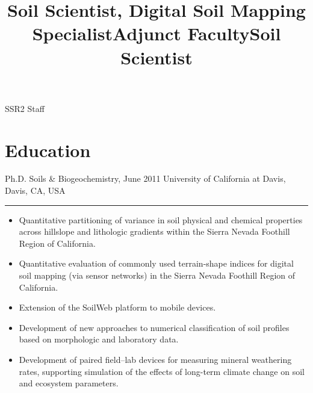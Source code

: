 \documentclass[overlapped,line,10pt,letterpaper]{res}
\begin{document}
\begin{resume}
\title{Soil Scientist, Digital Soil Mapping Specialist}
\begin{position}
\begin{minipage}{0.95\textwidth}
SSR2 Staff
\end{minipage}
\end{position}

\title{Adjunct Faculty}
\begin{position}
\end{position}

\title{Soil Scientist}
\begin{position}
\end{position}

\section{\bf Education}
Ph.D. Soils \& Biogeochemistry, June 2011 \newline
University of California at Davis, Davis, CA, USA
\\
\begin{minipage}{0.95\textwidth}
\hrule
\begin{itemize}[itemsep=0.05cm,leftmargin=*]
\small
\vspace{0.125cm}

	\item Quantitative partitioning of variance in soil physical and chemical properties across hillslope and lithologic gradients within the Sierra Nevada Foothill Region of California.
	
	\item Quantitative evaluation of commonly used terrain-shape indices for digital soil mapping (via sensor networks) in the Sierra Nevada Foothill Region of California.
	
	\item Extension of the SoilWeb platform to mobile devices.
	
	\item Development of new approaches to numerical classification of soil profiles based on morphologic and laboratory data.
	
	\item Development of paired field--lab devices for measuring mineral weathering rates, supporting simulation of the effects of long-term climate change on soil and ecosystem parameters.
	

\end{itemize}
\end{minipage}
\end{resume}
\end{document}
